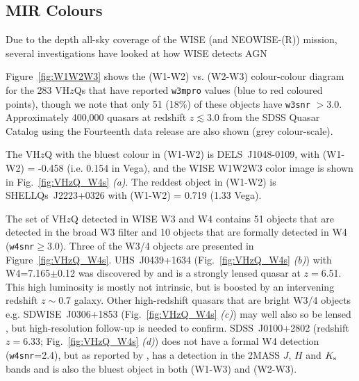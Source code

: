 \documentclass[usenatbib]{mnras}
\begin{document}
\subsection{MIR Colours}
Due to the depth all-sky coverage of the WISE (and NEOWISE-(R))
mission, several investigations have looked at how WISE detects AGN
\citep[e.g][]{Stern2012, Assef2012, Secrest2015, LaMassa2017,
Assef2018, Glikman2018, Hviding2018, LaMassa2019}

Figure~\ref{fig:W1W2W3} shows the (W1-W2) vs. (W2-W3) colour-colour
diagram for the 283 VH$z$Qs that have reported {\tt w3mpro} values
(blue to red coloured points), though we note that only 51 (18\%) of
these objects have {\tt w3snr} $>$3.0. Approximately 400,000 quasars
at redshift $z\lesssim3.0$ from the SDSS Quasar Catalog using the
Fourteenth data release \citep[DR14Q; ][]{Paris2018} are also shown
(grey colour-scale).

The VH$z$Q with the bluest colour in (W1-W2) is DELS~J1048-0109, with
(W1-W2) = -0.458 (i.e. 0.154 in Vega), and the WISE W1W2W3 color image
is shown in Fig.~\ref{fig:VHzQ_W4s} {\it(a)}. The reddest object in
(W1-W2) is SHELLQs~J2223+0326 with (W1-W2) = 0.719 (1.33 Vega).

The set of VH$z$Q detected in WISE W3 and W4 contains 51 objects that
are detected in the broad W3 filter and 10 objects that are formally
detected in W4 ({\tt w4snr}$\geq$3.0). Three of the W3/4 objects are
presented in Figure~\ref{fig:VHzQ_W4s}. UHS~J0439+1634
(Fig.~\ref{fig:VHzQ_W4s} {\it (b)}) with W4=7.165$\pm$0.12 was
discovered by \citet{Fan2019} and is a strongly lensed quasar at
$z=$6.51. This high luminosity is mostly not intrinsic, but is boosted
by an intervening redshift $z\sim$0.7 galaxy. Other high-redshift
quasars that are bright W3/4 objects e.g. SDWISE~J0306+1853
(Fig.~\ref{fig:VHzQ_W4s} {\it(c)}) may well also so be lensed
\citep[e.g.,][]{Glikman2018lens, Fan2019, Pacucci2019}, but
high-resolution follow-up is needed to confirm. SDSS~J0100+2802
(redshift $z=6.33$; Fig.~\ref{fig:VHzQ_W4s} {\it(d)}) does not have a
formal W4 detection ({\tt w4snr}=2.4), but as reported by
\citet{Wu2015}, has a detection in the 2MASS $J$, $H$ and $K_{\rm s}$
bands and is also the bluest object in both (W1-W3) and (W2-W3). 
\end{document}
